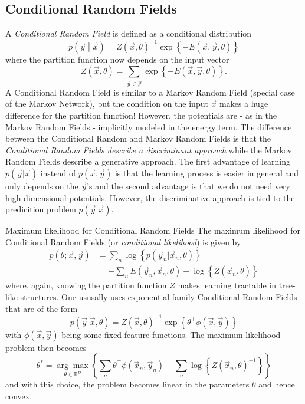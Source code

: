 \subsection{Conditional Random Fields}
A \emph{Conditional Random Field} is defined as a conditional distribution %
\begin{equation}
	p\left( \vec{y} \middle| \vec{x} \right) = {Z(\vec{x}, \theta)}^{-1} \exp\left\{ -E(\vec{x},\vec{y},\theta) \right\}
\end{equation}
where the partition function now depends on the input vector %
\begin{equation}
	Z(\vec{x},\theta) = \sum_{\vec{y}\in\mathcal{Y}} \exp\left\{ -E(\vec{x},\vec{y},\theta) \right\}. %
\end{equation}
A Conditional Random Field is similar to a Markov Random Field (special case of the Markov Network), but the condition on the input \ensuremath{\vec{x}} makes a huge difference for the partition function! %
However, the potentials are - as in the Markov Random Fields - implicitly modeled in the energy term. %
The difference between the Conditional Random and Markov Random Fields is that the \emph{Conditional Random Fields describe a discriminant approach} while the Markov Random Fields describe a generative approach. %
The first advantage of learning \ensuremath{p(\vec{y}|\vec{x})} instead of \ensuremath{p(\vec{x},\vec{y})} is that the learning process is easier in general and only depends on the \ensuremath{\vec{y}}'s and the second advantage is that we do not need very high-dimensional potentials. %
However, the discriminative approach is tied to the predicition problem \ensuremath{p(\vec{y}|\vec{x})}. %
\begin{topic}{0.3cm}{Maximum likelihood for Conditional Random Fields}
	The maximum likelihood for Conditional Random Fields (or \emph{conditional likelihood}) is given by %
	\begin{equation}
	\begin{aligned}
		p(\theta;\vec{x},\vec{y})
		&= \sum_n \log\left\{ p( \vec{y}_n | \vec{x}_n , \theta ) \right\}\\
		&= -\sum_n E( \vec{y}_n ,\vec{x}_n , \theta ) - \log\left\{ Z(\vec{x}_n,\theta) \right\}
	\end{aligned}
	\end{equation}
	where, again, knowing the partition function \ensuremath{Z} makes learning tractable in tree-like structures. %
	One ususally uses exponential family Conditional Random Fields that are of the form %
	\begin{equation}
		p(\vec{y}|\vec{x},\theta) = Z(\vec{x},\theta)^{-1} \exp\left\{ \theta^\top \phi(\vec{x},\vec{y}) \right\}
	\end{equation}
	with \ensuremath{\phi(\vec{x},\vec{y})} being some fixed feature functions. %
	The maximum likelihood problem then becomes %
	\begin{equation}
		\theta^* = \underset{\theta\in\mathbb{R}^D}{\arg\max}\left\{ \sum_n \theta^\top \phi(\vec{x}_n,\vec{y}_n) - \sum_n \log\left\{ Z(\vec{x}_n,\theta)^{-1} \right\}  \right\}
		\label{eq:CRF_ML}
	\end{equation}
	and with this choice, the problem becomes linear in the parameters \ensuremath{\theta} and hence convex. %
\end{topic}
